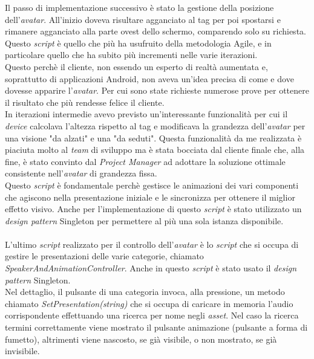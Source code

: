 \noindent
Il passo di implementazione successivo \`e stato la gestione della posizione dell'\textit{avatar\gloss}. All'inizio doveva risultare agganciato al tag per poi spostarsi e rimanere agganciato alla parte ovest dello schermo, comparendo solo su richiesta.\\
Questo \textit{script} \`e quello che pi\`u ha usufruito della metodologia Agile, e in particolare quello che ha subito pi\`u incrementi nelle varie iterazioni.\\
Questo perch\`e il cliente, non essendo un esperto di realt\`a aumentata e, soprattutto di applicazioni Android, non aveva un'idea precisa di come e dove dovesse apparire l'\textit{avatar\gloss}. Per cui sono state richieste numerose prove per ottenere il risultato che pi\`u rendesse felice il cliente.\\
In iterazioni intermedie avevo previsto un'interessante funzionalit\`a per cui il \textit{device} calcolava l'altezza rispetto al tag e modificava la grandezza dell'\textit{avatar\gloss} per una visione "da alzati" e una "da seduti". Questa funzionalit\`a da me realizzata \`e piaciuta molto al \textit{team} di sviluppo ma \`e stata bocciata dal cliente finale che, alla fine, \`e stato convinto dal \textit{Project Manager} ad adottare la soluzione ottimale consistente nell'\textit{avatar\gloss} di grandezza fissa.\\
Questo \textit{script} \`e fondamentale perch\`e gestisce le animazioni dei vari componenti che agiscono nella presentazione iniziale e le sincronizza per ottenere il miglior effetto visivo.
Anche per l'implementazione di questo \textit{script} \`e stato utilizzato un \textit{design pattern} Singleton per permettere al pi\`u una sola istanza disponibile.\\\\
\noindent
L'ultimo \textit{script} realizzato per il controllo dell'\textit{avatar\gloss} \`e lo \textit{script} che si occupa di gestire le presentazioni delle varie categorie, chiamato \textit{SpeakerAndAnimationController}. Anche in questo \textit{script} \`e stato usato il \textit{design pattern} Singleton.\\
Nel dettaglio, il pulsante di una categoria invoca, alla pressione, un metodo chiamato \textit{SetPresentation(string)} che si occupa di caricare in memoria l'audio corrispondente effettuando una ricerca per nome negli \textit{asset\gloss}. Nel caso la ricerca termini correttamente viene mostrato il pulsante animazione (pulsante a forma di fumetto), altrimenti viene nascosto, se gi\`a visibile, o non mostrato, se gi\`a invisibile.\\
